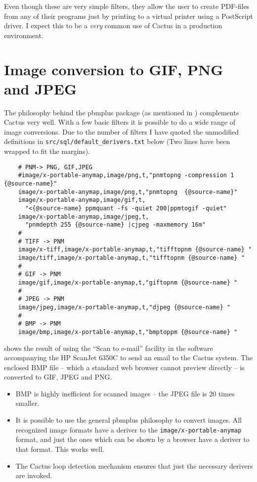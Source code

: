 Even though these are very simple filters, they allow the user to
create PDF-files from any of their programs just by printing to a
virtual printer using a PostScript driver.  I expect this to be a \textit{very}
common use of Cactus in a production environment.

\section{Image conversion to GIF, PNG and JPEG}
\label{sec:image-conversion}


The philosophy behind the pbmplus package (as mentioned in
) complements Cactus very well.  With a
few basic filters it is possible to do a wide range of image
conversions.  Due to the number of filters I have quoted the
unmodified definitions in \texttt{src/sql/default_derivers.txt} below
(Two lines have been wrapped to fit the margins).

\begin{verbatim}
    # PNM-> PNG, GIF,JPEG
    #image/x-portable-anymap,image/png,t,"pnmtopng -compression 1 {@source-name}"
    image/x-portable-anymap,image/png,t,"pnmtopng  {@source-name}"
    image/x-portable-anymap,image/gif,t,
      "<{@source-name} ppmquant -fs -quiet 200|ppmtogif -quiet"
    image/x-portable-anymap,image/jpeg,t,
      "pnmdepth 255 {@source-name} |cjpeg -maxmemory 16m"
    #
    # TIFF -> PNM
    image/x-tiff,image/x-portable-anymap,t,"tifftopnm {@source-name} "
    image/tiff,image/x-portable-anymap,t,"tifftopnm {@source-name} "
    #
    # GIF -> PNM
    image/gif,image/x-portable-anymap,t,"giftopnm {@source-name} "
    #
    # JPEG -> PNM
    image/jpeg,image/x-portable-anymap,t,"djpeg {@source-name} "
    #
    # BMP -> PNM
    image/bmp,image/x-portable-anymap,t,"bmptoppm {@source-name} "
\end{verbatim}


 shows the result of using the ``Scan to
e-mail'' facility in the software accompanying the HP ScanJet 6350C to
send an email to the Cactus system.  The enclosed BMP file -- which a
standard web browser cannot preview directly -- is converted to GIF,
JPEG and PNG.


\begin{itemize}
\item BMP is highly inefficient for scanned images -- the JPEG file is 20
  times smaller.

\item It is possible to use the general pbmplus philosophy to convert
  images.  All recognized image formats have a deriver to the
  \texttt{image/x-portable-anymap} format, and just the ones which can be
  shown by a browser have a deriver to that format.   This works well.
\item The Cactus loop detection mechanism ensures that just the
  necessary derivers are invoked.
\end{itemize}

